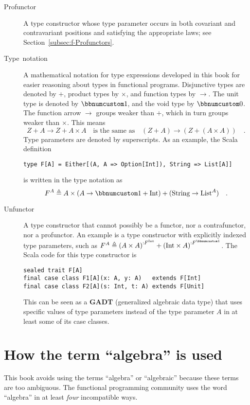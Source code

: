 \begin{description}
\item [{Profunctor}] A type constructor whose type parameter
occurs in both covariant and contravariant positions and satisfying
the appropriate laws; see Section~\ref{subsec:f-Profunctors}.
\item [{Type~notation}] A mathematical notation
for type expressions developed in this book for easier reasoning about
types in functional programs. Disjunctive types are denoted by $+$,
product types by $\times$, and function types by $\rightarrow$.
The unit type is denoted by $\bbnum 1$, and the void type by $\bbnum 0$.
The function arrow $\rightarrow$ groups weaker than $+$, which in
turn groups weaker than $\times$. This means
\[
Z+A\rightarrow Z+A\times A\quad\text{is the same as}\quad\left(Z+A\right)\rightarrow\left(Z+\left(A\times A\right)\right)\quad.
\]
 Type parameters are denoted by superscripts. As an example, the Scala
definition\texttt{}
\begin{lstlisting}
type F[A] = Either[(A, A => Option[Int]), String => List[A]]
\end{lstlisting}
is written in the type notation as 
\[
F^{A}\triangleq A\times\left(A\rightarrow\bbnum 1+\text{Int}\right)+(\text{String}\rightarrow\text{List}^{A})\quad.
\]
\item [{Unfunctor}] A type constructor that cannot possibly
be a functor, nor a contrafunctor, nor a profunctor. An example is
a type constructor with explicitly indexed type parameters, such as
$F^{A}\triangleq\left(A\times A\right)^{:F^{\text{Int}}}+\left(\text{Int}\times A\right)^{:F^{\bbnum 1}}$.
The Scala code for this type constructor is
\begin{lstlisting}
sealed trait F[A]
final case class F1[A](x: A, y: A)   extends F[Int]
final case class F2[A](s: Int, t: A) extends F[Unit]
\end{lstlisting}
This can be seen as a \textbf{GADT}
(generalized algebraic data type) that uses specific values of type
parameters instead of the type parameter $A$ in at least some of
its case classes.
\end{description}

\section{How the term \textsf{``}algebra\textsf{''} is used}

This book avoids using the terms \textsf{``}algebra\textsf{''} or
\textsf{``}algebraic\textsf{''} because these terms are too ambiguous.
The functional programming community uses the word \textsf{``}algebra\textsf{''} in
at least \emph{four} incompatible ways.

